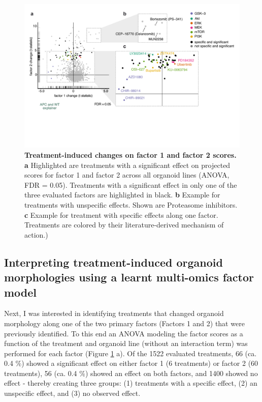 \begin{flushleft}
\begin{figure}[h]
\centering
\includegraphics[scale=0.75,
                keepaspectratio]{figures/adenomaprofiling/pdf/fig_5_3_1.pdf}
\caption[Treatment-induced changes on factor 1 and factor 2 scores]{\textbf{Treatment-induced changes on factor 1 and factor 2 scores. a} Highlighted are treatments with a significant effect on projected scores for factor 1 and factor 2 across all organoid lines (ANOVA, FDR = 0.05). Treatments with a significant effect in only one of the three evaluated factors are highlighted in black. \textbf{b} Example for treatments with unspecific effects. Shown are Proteasome inhibitors. \textbf{c} Example for treatment with specific effects along one factor. Treatments are colored by their literature-derived mechanism of action.)}
\label{fig_181}
\end{figure}
\bigbreak

\subsection{Interpreting treatment-induced organoid morphologies using a learnt multi-omics factor model}

Next, I was interested in identifying treatments that changed organoid morphology along one of the two primary factors (Factors 1 and 2) that were previously identified. To this end an ANOVA modeling the factor scores as a function of the treatment and organoid line (without an interaction term) was performed for each factor (Figure \ref{fig_181} a). Of the 1522 evaluated treatments, 66 (ca. 0.4 \%) showed a significant effect on either factor 1 (6 treatments) or factor 2 (60 treatments), 56 (ca. 0.4 \%) showed an effect on both factors, and 1400 showed no effect - thereby creating three groups: (1) treatments with a specific effect, (2) an unspecific effect, and (3) no observed effect. 
\par


\end{flushleft}
